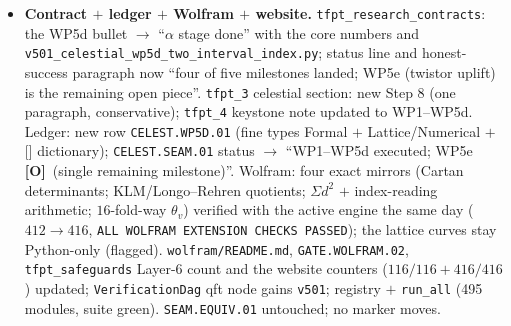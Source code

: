 \documentclass[11pt]{article}
\providecommand{\mO}{\textbf{[O]}}\providecommand{\mX}{\textbf{[X]}}
\begin{document}
\begin{itemize}[leftmargin=1.5em]
\item \textbf{Contract $+$ ledger $+$ Wolfram $+$ website.} \texttt{tfpt\_research\_contracts}: the
WP5d bullet $\to$ ``$\alpha$ stage done'' with the core numbers and
\texttt{v501\_celestial\_wp5d\_two\_interval\_index.py}; status line and honest-success paragraph now
``four of five milestones landed; WP5e (twistor uplift) is the remaining open piece''.
\texttt{tfpt\_3} celestial section: new Step 8 (one paragraph, conservative); \texttt{tfpt\_4}
keystone note updated to WP1--WP5d. Ledger: new row \texttt{CELEST.WP5D.01} (fine types Formal $+$
Lattice/Numerical $+$ [\mC] dictionary); \texttt{CELEST.SEAM.01} status $\to$ ``WP1--WP5d executed;
WP5e \mO\ (single remaining milestone)''. Wolfram: four exact mirrors (Cartan determinants;
KLM/Longo--Rehren quotients; $\Sigma d^2$ $+$ index-reading arithmetic; $16$-fold-way $\theta_v$)
verified with the active engine the same day ($412\to416$, \texttt{ALL WOLFRAM EXTENSION CHECKS
PASSED}); the lattice curves stay Python-only (flagged). \texttt{wolfram/README.md},
\texttt{GATE.WOLFRAM.02}, \texttt{tfpt\_safeguards} Layer-6 count and the website counters
($116/116+416/416$) updated; \texttt{VerificationDag} qft node gains \texttt{v501}; registry $+$
\texttt{run\_all} (495 modules, suite green). \texttt{SEAM.EQUIV.01} untouched; no marker moves.
\end{itemize}
\end{document}
